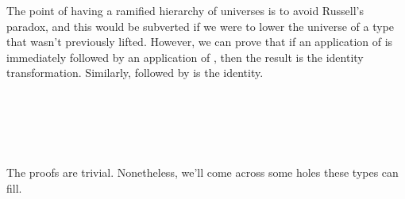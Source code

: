 The point of having a ramified hierarchy of universes is to avoid Russell's paradox, and this would be subverted if we were to lower the universe of a type that wasn't previously lifted.  However, we can prove that if an application of  is immediately followed by an application of , then the result is the identity transformation. Similarly,  followed by  is the identity.
\ccpad
\begin{code}%
\>[0]\AgdaSpace{}%
\AgdaSymbol{:}\AgdaSpace{}%
\AgdaSymbol{\{}\AgdaSpace{}%
\AgdaSpace{}%
\AgdaSymbol{:}\AgdaSpace{}%
\AgdaSymbol{\}\{}\AgdaSpace{}%
\AgdaSymbol{:}\AgdaSpace{}%
\AgdaSpace{}%
\AgdaSymbol{\}}\AgdaSpace{}%
\AgdaSpace{}%
\AgdaSpace{}%
\AgdaSpace{}%
\AgdaSpace{}%
\AgdaSpace{}%
\AgdaSpace{}%
\AgdaSymbol{(}\AgdaSymbol{\{}\AgdaSymbol{\}}\AgdaSpace{}%
\AgdaSymbol{)}\<%
\\
\>[0]\AgdaSpace{}%
\AgdaSymbol{=}\AgdaSpace{}%
\<%
\\
%
\\[\AgdaEmptyExtraSkip]%
\>[0]\AgdaSpace{}%
\AgdaSymbol{:}\AgdaSpace{}%
\AgdaSymbol{\{}\AgdaSpace{}%
\AgdaSpace{}%
\AgdaSymbol{:}\AgdaSpace{}%
\AgdaSymbol{\}\{}\AgdaSpace{}%
\AgdaSymbol{:}\AgdaSpace{}%
\AgdaSpace{}%
\AgdaSymbol{\}}\AgdaSpace{}%
\AgdaSpace{}%
\AgdaSymbol{\{}\AgdaSymbol{\}\{}\AgdaSymbol{\}}\AgdaSpace{}%
\AgdaSpace{}%
\AgdaSpace{}%
\AgdaSpace{}%
\AgdaSpace{}%
\<%
\\
\>[0]\AgdaSpace{}%
\AgdaSymbol{=}\AgdaSpace{}%
\<%
\end{code}
\ccpad
The proofs are trivial. Nonetheless, we'll come across some holes these types can fill.





